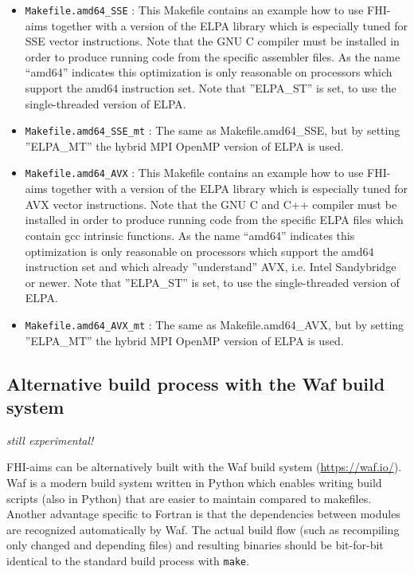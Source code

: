 \begin{itemize}
    cross-links C and Fortran based functionality, although the
    actual functionality that Makefile.shm provides --  access to
    shared-memory arrays in the Hartree potential -- is no longer
    needed at this point.
  \item \texttt{Makefile.amd64\_SSE} : This Makefile contains an
    example how to use FHI-aims together with a version of the 
    ELPA library which is especially tuned for SSE vector instructions.
    Note that the GNU C compiler must be installed in order to produce
    running code from the specific assembler files. As the name
    ``amd64'' indicates this optimization is only reasonable on
    processors which support the amd64 instruction set.
    Note that ''ELPA\_ST'' is set, to use the single-threaded version
    of ELPA.
  \item \texttt{Makefile.amd64\_SSE\_mt} : The same as
    Makefile.amd64\_SSE, but by setting ''ELPA\_MT'' the hybrid MPI
    OpenMP version of ELPA is used.
  \item \texttt{Makefile.amd64\_AVX} : This Makefile contains an
    example how to use FHI-aims together with a version of the 
    ELPA library which is especially tuned for AVX vector instructions.
    Note that the GNU C and C++ compiler must be installed in order to produce
    running code from the specific ELPA files which contain gcc
    intrinsic functions. As the name  ``amd64'' indicates this
    optimization is only reasonable on  processors which support the 
    amd64 instruction set and which already ''understand'' AVX,
    i.e. Intel Sandybridge or newer. Note that ''ELPA\_ST'' is set, to 
    use the single-threaded version of ELPA.
  \item \texttt{Makefile.amd64\_AVX\_mt} : The same as
    Makefile.amd64\_AVX, but by setting ''ELPA\_MT'' the hybrid MPI
    OpenMP version of ELPA is used.

\end{itemize}

\subsection{Alternative build process with the Waf build system}

\emph{still experimental!}

FHI-aims can be alternatively built with the Waf build system 
(\url{https://waf.io/}).
Waf is a modern build system written in Python which enables writing build 
scripts (also in Python) that are easier to maintain compared to makefiles.
Another advantage specific to Fortran is that the dependencies between modules 
are recognized automatically by Waf.
The actual build flow (such as recompiling only changed and depending files) and 
resulting binaries should be bit-for-bit identical to the standard build process 
with \verb+make+.

